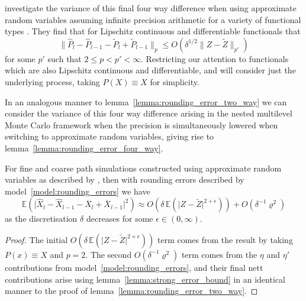 \documentclass[manuscript,review]{acmart}
\begin{document}
\citet{giles2020approximate,giles2020approximating} investigate the variance of this final four way difference when using approximate random variables assuming infinite precision arithmetic for a variety of functional types \citep[lemmas~4.10 and 4.11]{giles2020approximate} \citep[corollaries~6.2.6.2 and 6.2.6.3]{sheridan2020nested}. They find that for Lipschitz continuous and differentiable functionals that 
\begin{equation*}
\lVert \widehat{P}_l - \widehat{P}_{l-1} - \widetilde{P}_l + \widetilde{P}_{l-1}\rVert_p 
\leq O(\delta^{1/2} \lVert Z - \widetilde{Z} \rVert_{p'}) 
\end{equation*}
for some  $ p' $ such that $ 2 \leq p < p' < \infty $. Restricting our attention to functionals which are also Lipschitz continuous and differentiable, and will consider just the underlying process, taking $ P(X)\equiv X $ for simplicity. 

In an analogous manner to lemma~\ref{lemma:rounding_error_two_way} we can consider the variance of this four way difference arising in the nested multilevel Monte Carlo framework when the precision is simultaneously lowered when switching to approximate random variables, giving rise to lemma~\ref{lemma:rounding_error_four_way}.

\begin{lemma}
\label{lemma:rounding_error_four_way}
For fine and coarse path simulations constructed using approximate random variables as described by \citet{giles2020approximate}, then with rounding errors described by model~\ref{model:rounding_errors} we have 
\begin{equation*}
\mathbb{E}(\lvert \widehat{X}_l - \widehat{X}_{l-1} - \overline{X}_l + \overline{X}_{l-1}\rvert^2) 
\approx O(\delta\, \mathbb{E}(\lvert Z - \widetilde{Z} \rvert^{2 + \epsilon})) + O(\delta^{-1}\varrho^2) 
\end{equation*}
as the discretisation $ \delta $ decreases for some $ \epsilon \in (0, \infty)$.
\end{lemma}

\begin{proof}
The initial $ O(\delta\, \mathbb{E}(\lvert Z - \widetilde{Z} \rvert^{2 + \epsilon})) $ term comes from the result by \citet{giles2020approximate,giles2020approximating} taking $ P(x) \equiv X $ and $ p = 2 $. The second  $ O(\delta^{-1}\varrho^2)  $ term comes from the $ \eta $ and $ \eta' $ contributions from model~\ref{model:rounding_errors}, and their final nett contributions arise using lemma~\ref{lemma:strong_error_bound} in an identical manner to the proof of lemma~\ref{lemma:rounding_error_two_way}. \qedhere
\end{proof}
\end{document}
